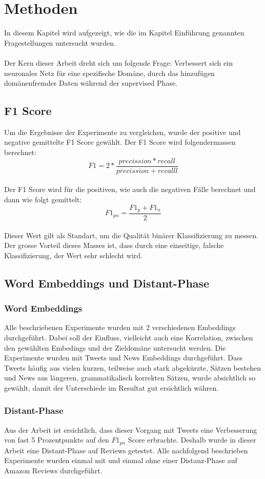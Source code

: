\chapter{Methoden}
In diesem Kapitel wird aufgezeigt, wie die im Kapitel Einführung genannten Fragestellungen untersucht wurden.\\\\
Der Kern dieser Arbeit dreht sich um folgende Frage: Verbessert sich ein neuronales Netz für eine spezifische Domäne, durch das hinzufügen domänenfremder Daten während der supervised Phase.
\section{F1 Score}
Um die Ergebnisse der Experimente zu vergleichen, wurde der positive und negative gemittelte F1 Score gewählt.
Der F1 Score wird folgendermassen berechnet:\\
\begin{equation}
F1 = 2*\frac{precission*recall}{precission+recalll}
\end{equation}\\
Der F1 Score wird für die positiven, wie auch die negativen Fälle berechnet und dann wie folgt gemittelt:\\
\begin{equation}
F1_{pn} = \frac{F1_p+F1_n}{2}
\end{equation}\\
Dieser Wert gilt als Standart, um die Qualität binärer Klassifizierung zu messen. Der grosse Vorteil dieses Masses ist, dass durch eine einseitige, falsche Klassifizierung, der Wert sehr schlecht wird.
\section{Word Embeddings und Distant-Phase}
\subsection{Word Embeddings}
Alle beschriebenen Experimente wurden mit 2 verschiedenen Embeddings durchgeführt. Dabei soll der Einfluss, vielleicht auch eine Korrelation, zwischen den gewählten Embedings und der Zieldomäne untersucht werden. Die Experimente wurden mit Tweets und News Embeddings durchgeführt. Dass Tweets häufig aus vielen kurzen, teilweise auch stark abgekürzte, Sätzen bestehen und News aus längeren, grammatikalisch korrekten Sätzen, wurde absichtlich so gewählt, damit der Unterschiede im Resultat gut ersichtlich währen.
\subsection{Distant-Phase}
Aus der Arbeit \cite{deriu2016sentiment} ist ersichtlich, dass dieser Vorgang mit Tweets eine Verbesserung von fast 5 Prozentpunkte auf den $F1_{pn}$ Score erbrachte.
Deshalb wurde in dieser Arbeit eine Distant-Phase auf Reviews getestet. Alle nachfolgend beschrieben Experimente wurden einmal mit und einmal ohne einer Distanz-Phase auf Amazon Reviews durchgeführt.


